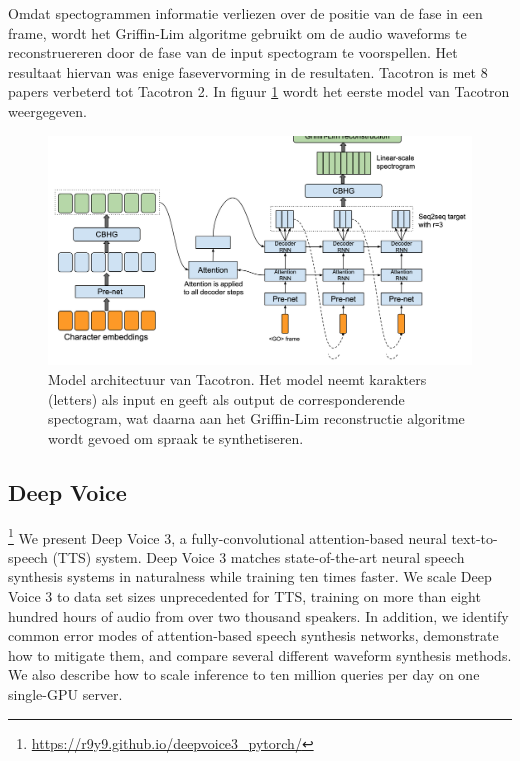 Omdat spectogrammen informatie verliezen over de positie van de fase in een frame, wordt het Griffin-Lim algoritme gebruikt om de audio waveforms te reconstruereren door de fase van de input spectogram te voorspellen. Het resultaat hiervan was enige fasevervorming in de resultaten. Tacotron is met 8 papers verbeterd tot Tacotron 2. In figuur \ref{fig:tacotron} wordt het eerste model van Tacotron weergegeven.

\begin{figure}
    \centering
    \includegraphics[width=\textwidth]{figures/tacotron.png}
    \caption{Model architectuur van Tacotron. Het model neemt karakters (letters) als input en geeft als output de corresponderende spectogram, wat daarna aan het Griffin-Lim reconstructie algoritme wordt gevoed om spraak te synthetiseren.}
    \label{fig:tacotron}
\end{figure}


\subsection{Deep Voice}
\footnote{\url{https://r9y9.github.io/deepvoice3_pytorch/}}
We present Deep Voice 3, a fully-convolutional attention-based neural text-to-speech (TTS) system. Deep Voice 3 matches state-of-the-art neural speech synthesis systems in naturalness while training ten times faster. We scale Deep Voice 3 to data set sizes unprecedented for TTS, training on more than eight hundred hours of audio from over two thousand speakers. In addition, we identify common error modes of attention-based speech synthesis networks, demonstrate how to mitigate them, and compare several different waveform synthesis methods. We also describe how to scale inference to ten million queries per day on one single-GPU server. 


